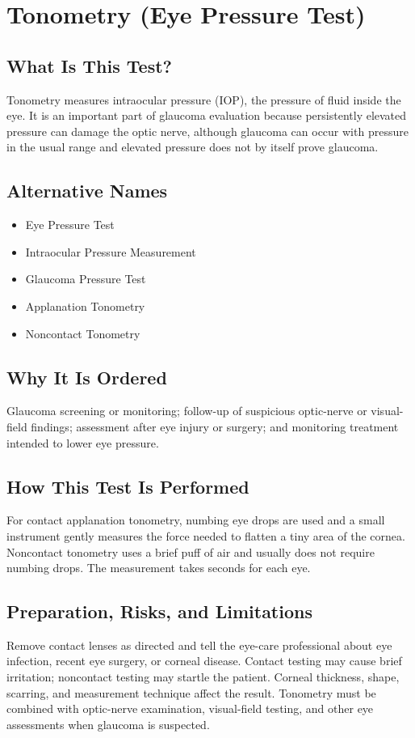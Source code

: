\chapter{Tonometry (Eye Pressure Test)}

\section*{What Is This Test?}
Tonometry measures intraocular pressure (IOP), the pressure of fluid inside the eye. It is an important part of glaucoma evaluation because persistently elevated pressure can damage the optic nerve, although glaucoma can occur with pressure in the usual range and elevated pressure does not by itself prove glaucoma.

\section*{Alternative Names}
\begin{itemize}
  \item Eye Pressure Test
  \item Intraocular Pressure Measurement
  \item Glaucoma Pressure Test
  \item Applanation Tonometry
  \item Noncontact Tonometry
\end{itemize}
\section*{Why It Is Ordered}
Glaucoma screening or monitoring; follow-up of suspicious optic-nerve or visual-field findings; assessment after eye injury or surgery; and monitoring treatment intended to lower eye pressure.

\section*{How This Test Is Performed}
For contact applanation tonometry, numbing eye drops are used and a small instrument gently measures the force needed to flatten a tiny area of the cornea. Noncontact tonometry uses a brief puff of air and usually does not require numbing drops. The measurement takes seconds for each eye.

\section*{Preparation, Risks, and Limitations}
Remove contact lenses as directed and tell the eye-care professional about eye infection, recent eye surgery, or corneal disease. Contact testing may cause brief irritation; noncontact testing may startle the patient. Corneal thickness, shape, scarring, and measurement technique affect the result. Tonometry must be combined with optic-nerve examination, visual-field testing, and other eye assessments when glaucoma is suspected.


